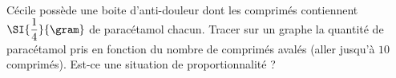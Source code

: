 
\begin{exercice}\label{exo2smath-0032}

    Cécile possède une boite d'anti-douleur dont les comprimés contiennent \( \SI{\dfrac{ 1 }{ 4 }}{\gram}\) de paracétamol chacun. Tracer sur un graphe la quantité de paracétamol pris en fonction du nombre de comprimés avalés (aller jusqu'à \( 10\) comprimés). Est-ce une situation de proportionnalité ?

\end{exercice}
